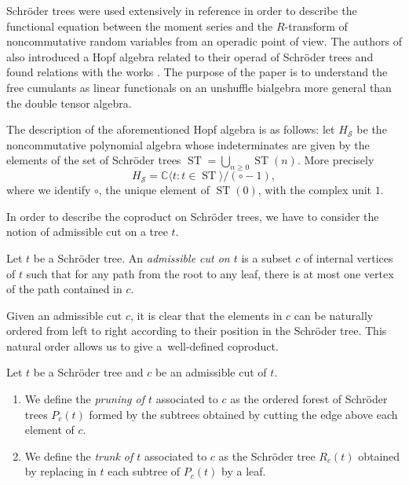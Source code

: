 \documentclass[11pt]{article}
\numberwithin{equation}{section}
\numberwithin{equation}{section}
\newcommand{\ST}{\operatorname{ST}}
\newcommand{\cHS}{H_\mathcal{S}}
\begin{document}
Schr\"oder trees were used extensively in reference \cite{JMNT} in order to describe the functional equation between the moment series and the $R$-transform of noncommutative random variables from an operadic point of view. The authors of \cite{JMNT} also introduced a Hopf algebra related to their operad of Schr\"oder trees and found relations with the works \cite{EFP1,EFP3}. The purpose of the paper \cite{JMNT} is to understand the free cumulants as linear functionals on an unshuffle bialgebra more general than the double tensor algebra.

The description of the aforementioned Hopf algebra is as follows: let $\cHS$ be the noncommutative polynomial algebra whose indeterminates are given by the elements of the set of Schr\"oder trees $\ST = \bigcup_{n\geq0} \ST(n)$. More precisely
\[
	\cHS = \mathbb{C}\langle t\colon t\in \ST\rangle/ (\circ -1),
\]
where we identify $\circ$, the unique element of $\ST(0)$, with the complex unit $1$.

In order to describe the coproduct on Schr\"oder trees, we have to consider the notion of {admissible cut} on a tree $t$.

\begin{Definition}
\label{def:admcut}
Let $t$ be a Schr\"oder tree. An \textit{admissible cut on $t$} is a subset $c$ of internal vertices of $t$ such that for any path from the root to any leaf, there is at most one vertex of the path contained in $c$.
\end{Definition}

Given an admissible cut $c$, it is clear that the elements in $c$ can be naturally ordered from left to right according to their position in the Schr\"oder tree. This natural order allows us to give a~well-defined coproduct.

\begin{Definition}\label{def:PrunCuts}
Let $t$ be a Schr\"oder tree and $c$ be an admissible cut of $t$.
\begin{enumerate}\itemsep=0pt
\item[i)] We define the \textit{pruning of $t$} associated to $c$ as the ordered forest of Schr\"oder trees $P_c(t)$ formed by the subtrees obtained by cutting the edge above each element of $c$.
\item[ii)] We define the \textit{trunk of $t$} associated to $c$ as the Schr\"oder tree $R_c(t)$ obtained by replacing in $t$ each subtree of $P_c(t)$ by a leaf.
\end{enumerate}
\end{Definition}
\end{document}
